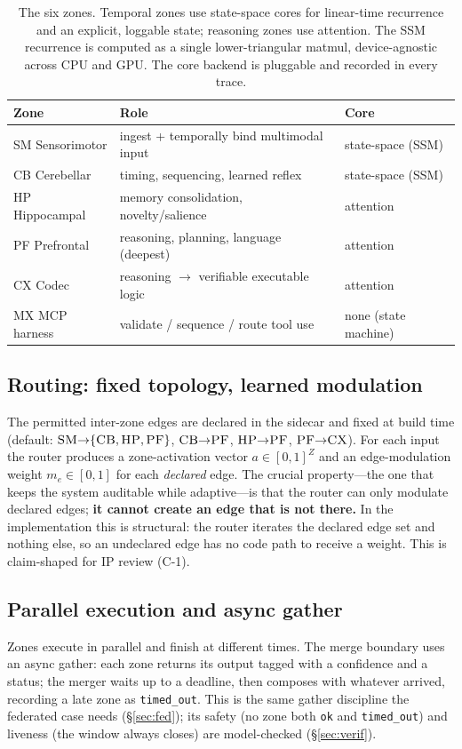 \documentclass[11pt]{article}
\newcommand{\zone}[1]{\textsc{#1}}
\begin{document}
\begin{table}[t]\centering\small
\begin{tabular}{@{}lll@{}}
\toprule
Zone & Role & Core \\
\midrule
\zone{SM} Sensorimotor & ingest + temporally bind multimodal input & state-space (SSM) \\
\zone{CB} Cerebellar & timing, sequencing, learned reflex & state-space (SSM) \\
\zone{HP} Hippocampal & memory consolidation, novelty/salience & attention \\
\zone{PF} Prefrontal & reasoning, planning, language (deepest) & attention \\
\zone{CX} Codec & reasoning $\rightarrow$ verifiable executable logic & attention \\
\zone{MX} MCP harness & validate / sequence / route tool use & none (state machine) \\
\bottomrule
\end{tabular}
\caption{The six zones. Temporal zones use state-space cores for linear-time recurrence and an
explicit, loggable state; reasoning zones use attention. The SSM recurrence is computed as a single
lower-triangular matmul, device-agnostic across CPU and GPU. The core backend is pluggable and
recorded in every trace.}
\label{tab:zones}
\end{table}

\subsection{Routing: fixed topology, learned modulation}
The permitted inter-zone edges are declared in the sidecar and fixed at build time (default:
$\zone{SM}{\to}\{\zone{CB},\zone{HP},\zone{PF}\}$, $\zone{CB}{\to}\zone{PF}$, $\zone{HP}{\to}\zone{PF}$,
$\zone{PF}{\to}\zone{CX}$). For each input the router produces a zone-activation vector
$a\in[0,1]^{Z}$ and an edge-modulation weight $m_e\in[0,1]$ for each \emph{declared} edge. The crucial
property---the one that keeps the system auditable while adaptive---is that the router can only
modulate declared edges; \textbf{it cannot create an edge that is not there.} In the implementation
this is structural: the router iterates the declared edge set and nothing else, so an undeclared edge
has no code path to receive a weight. This is claim-shaped for IP review (C-1).

\subsection{Parallel execution and async gather}
Zones execute in parallel and finish at different times. The merge boundary uses an async gather:
each zone returns its output tagged with a confidence and a status; the merger waits up to a deadline,
then composes with whatever arrived, recording a late zone as \texttt{timed\_out}. This is the same
gather discipline the federated case needs (\S\ref{sec:fed}); its safety (no zone both \texttt{ok}
and \texttt{timed\_out}) and liveness (the window always closes) are model-checked
(\S\ref{sec:verif}).
\end{document}
